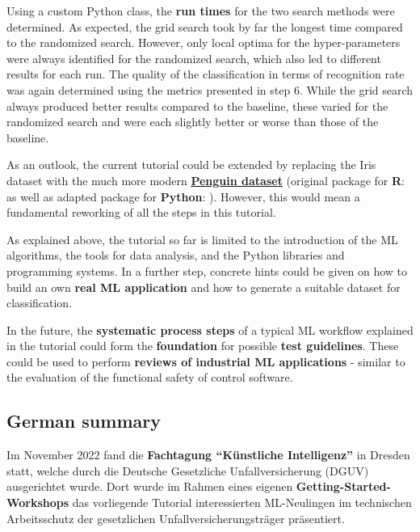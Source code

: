 \documentclass [oneside,10pt,a4paper,ngerman,BCOR10mm,headsepline,parindent,final]{scrartcl}
\begin{document}
Using a custom Python class, the \textbf{run times} for the two search
methods were determined. As expected, the grid search took by far the
longest time compared to the randomized search. However, only local
optima for the hyper-parameters were always identified for the
randomized search, which also led to different results for each run. The
quality of the classification in terms of recognition rate was again
determined using the metrics presented in step 6. While the grid search
always produced better results compared to the baseline, these varied
for the randomized search and were each slightly better or worse than
those of the baseline.

As an outlook, the current tutorial could be extended by replacing the
Iris dataset with the much more modern
\textbf{\href{https://github.com/mcnakhaee/palmerpenguins}{Penguin
dataset}} (original package for \textbf{R}: \cite{palmerpenguins_R_2020}
as well as adapted package for \textbf{Python}:
\cite{palmerpenguins_Python_2020}). However, this would mean a
fundamental reworking of all the steps in this tutorial.

As explained above, the tutorial so far is limited to the introduction
of the ML algorithms, the tools for data analysis, and the Python
libraries and programming systems. In a further step, concrete hints
could be given on how to build an own \textbf{real ML application} and
how to generate a suitable dataset for classification.

In the future, the \textbf{systematic process steps} of a typical ML
workflow explained in the tutorial could form the \textbf{foundation}
for possible \textbf{test guidelines}. These could be used to perform
\textbf{reviews of industrial ML applications} - similar to the
evaluation of the functional safety of control software.

    \hypertarget{german-summary}{%
\subsection{German summary}\label{german-summary}}

Im November 2022 fand die \textbf{Fachtagung ``Künstliche Intelligenz''}
in Dresden statt, welche durch die Deutsche Gesetzliche
Unfallversicherung (DGUV) ausgerichtet wurde. Dort wurde im Rahmen eines
eigenen \textbf{Getting-Started-Workshops} das vorliegende Tutorial
interessierten ML-Neulingen im technischen Arbeitsschutz der
gesetzlichen Unfallversicherungsträger präsentiert.
\end{document}
